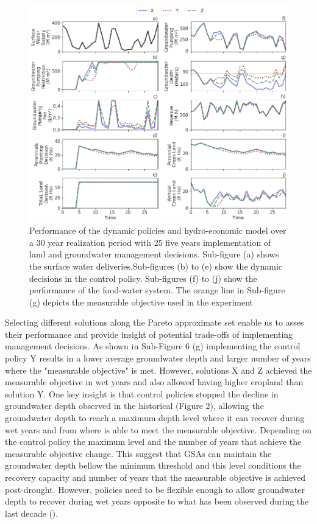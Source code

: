 \documentclass[11pt,a4paper]{article}
\begin{document}
\begin{figure}[H]
    \centering
    \includegraphics[width=1\textwidth]{selected_policies_performance.png}
    \caption{Performance of the dynamic policies and hydro-economic model over a 30 year realization period with 25 five years implementation of land and groundwater management decisions. Sub-figure (a) shows the surface water deliveries.Sub-figures (b) to (e) show the dynamic decisions in the control policy. Sub-figures (f) to (j) show the performance of the food-water system. The orange line in Sub-figure (g) depicts the measurable objective used in the experiment} \label{fig:parallel_robustness}
\end{figure}

Selecting different solutions along the Pareto approximate set enable us to asses their performance and provide insight of potential trade-offs of implementing management decisions. As shown in Sub-Figure 6 (g) implementing the control policy Y results in a lower average groundwater depth and larger number of years where the "measurable objective" is met. However, solutions X and Z achieved the measurable objective in wet years and also allowed having higher cropland than solution Y. 
One key insight is that control policies stopped the decline in groundwater depth observed in the historical (Figure 2), allowing the groundwater depth to reach a maximum depth level where it can recover during wet years and from where is able to meet the measurable objective. Depending on the control policy the maximum level and the number of years that achieve the measurable objective change. This suggest that GSAs can maintain the groundwater depth bellow the minimum threshold and this level conditions the recovery capacity and number of years that the measurable objective is achieved post-drought. However, policies need to be flexible enough to allow groundwater depth to recover during wet years opposite to what has been observed during the last decade (\cite{liu_groundwater_2022,alam_post-drought_2021}).
\end{document}
